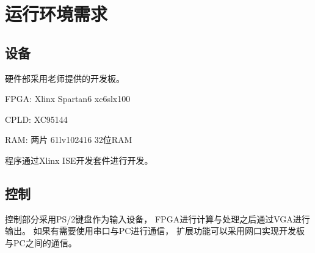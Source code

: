 \section{运行环境需求}
    \subsection{设备}
        硬件部采用老师提供的开发板。

        FPGA: Xlinx Spartan6 xc6slx100

        CPLD: XC95144

        RAM: 两片 61lv102416 32位RAM 

        程序通过Xlinx ISE开发套件进行开发。
    \subsection{控制}
        控制部分采用PS/2键盘作为输入设备，%
        FPGA进行计算与处理之后通过VGA进行输出。%
        如果有需要使用串口与PC进行通信，%
        扩展功能可以采用网口实现开发板与PC之间的通信。


